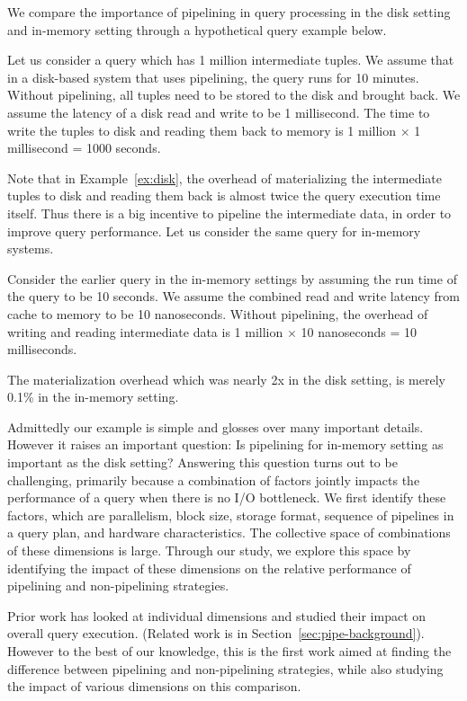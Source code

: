 We compare the importance of pipelining in query processing in the disk setting and in-memory setting through a hypothetical query example below.

\begin{example}\label{ex:disk}
Let us consider a query which has 1 million intermediate tuples.
We assume that in a disk-based system that uses pipelining, the query runs for 10 minutes. 
Without pipelining, all tuples need to be stored to the disk and brought back.
We assume the latency of a disk read and write to be 1 millisecond.
The time to write the tuples to disk and reading them back to memory is 1 million $\times$ 1 millisecond = 1000 seconds.
\end{example}

Note that in Example~\ref{ex:disk}, the overhead of materializing the intermediate tuples to disk and reading them back is almost twice the query execution time itself. 
Thus there is a big incentive to pipeline the intermediate data, in order to improve query performance. 
Let us consider the same query for in-memory systems.

\begin{example}\label{ex:in-mem}
Consider the earlier query in the in-memory settings by assuming the run time of the query to be 10 seconds. 
We assume the combined read and write latency from cache to memory to be 10 nanoseconds.
Without pipelining, the overhead of writing and reading intermediate data is 1 million $\times$ 10 nanoseconds = 10 milliseconds.
\end{example}

The materialization overhead which was nearly 2x in the disk setting, is merely 0.1\% in the in-memory setting.

Admittedly our example is simple and glosses over many important details. 
However it raises an important question: Is pipelining for in-memory setting as important as the disk setting? 
Answering this question turns out to be challenging, primarily because a combination of factors jointly impacts the performance of a query when there is no I/O bottleneck. 
We first identify these factors, which are parallelism, block size, storage format, sequence of pipelines in a query plan, and hardware characteristics.
The collective space of combinations of these dimensions is large. 
Through our study, we explore this space by identifying the impact of these dimensions on the relative performance of pipelining and non-pipelining strategies.

Prior work has looked at individual dimensions and studied their impact on overall query execution. (Related work is in Section~\ref{sec:pipe-background}).
However to the best of our knowledge, this is the first work aimed at finding the difference between pipelining and non-pipelining strategies, while also studying the impact of various dimensions on this comparison. 
%

